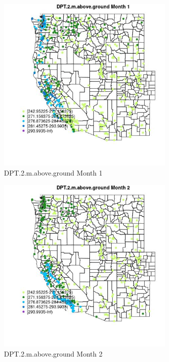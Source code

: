 \begin{figure} 
\centering  
\includegraphics[width=0.77\textwidth]{Code_Outputs/Report_ML_input_PM25_Step4_part_e_de_duplicated_aves_compiled_2019-05-18wNAs_MapObsMo1DPT2maboveground.jpg} 
\caption{\label{fig:Report_ML_input_PM25_Step4_part_e_de_duplicated_aves_compiled_2019-05-18wNAsMapObsMo1DPT2maboveground}DPT.2.m.above.ground Month 1} 
\end{figure} 
 

\begin{figure} 
\centering  
\includegraphics[width=0.77\textwidth]{Code_Outputs/Report_ML_input_PM25_Step4_part_e_de_duplicated_aves_compiled_2019-05-18wNAs_MapObsMo2DPT2maboveground.jpg} 
\caption{\label{fig:Report_ML_input_PM25_Step4_part_e_de_duplicated_aves_compiled_2019-05-18wNAsMapObsMo2DPT2maboveground}DPT.2.m.above.ground Month 2} 
\end{figure} 
 

